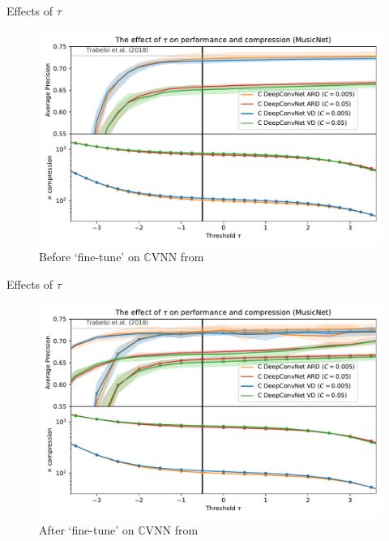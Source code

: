\documentclass{beamer}
\newcommand{\cplx}{\mathbb{C}}
\begin{document}
\begin{frame}[c]{Effects of $\tau$}{\insertsection}
  \begin{figure}[t]
    \centering
    \includegraphics[width=\linewidth]{figure__musicnet__threshold.pdf}
    \\
    {Before `fine-tune' on $\cplx$VNN from \cite{trabelsi_deep_2018}}
  \end{figure}
\end{frame}

\begin{frame}[c]{Effects of $\tau$}{\insertsection}
  \begin{figure}[t]
    \centering
    \includegraphics[width=\linewidth]{figure__musicnet__threshold__fine-tune.pdf}
    \\
    {After `fine-tune' on $\cplx$VNN from \cite{trabelsi_deep_2018}}
  \end{figure}
\end{frame}
\end{document}
